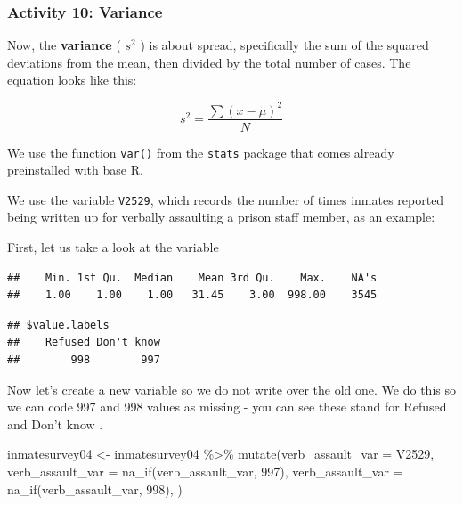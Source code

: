 \documentclass[
]{book}
\newenvironment{Shaded}{\begin{snugshade}}{\end{snugshade}}
\newcommand{\AttributeTok}[1]{\textcolor[rgb]{0.77,0.63,0.00}{#1}}
\newcommand{\DecValTok}[1]{\textcolor[rgb]{0.00,0.00,0.81}{#1}}
\newcommand{\FunctionTok}[1]{\textcolor[rgb]{0.00,0.00,0.00}{#1}}
\newcommand{\NormalTok}[1]{#1}
\newcommand{\OtherTok}[1]{\textcolor[rgb]{0.56,0.35,0.01}{#1}}
\newcommand{\SpecialCharTok}[1]{\textcolor[rgb]{0.00,0.00,0.00}{#1}}
\begin{document}
\hypertarget{activity-10-variance}{%
\subsubsection{Activity 10: Variance}\label{activity-10-variance}}

Now, the \textbf{variance} ( \(s^2\) ) is about spread, specifically the sum of the squared deviations from the mean, then divided by the total number of cases. The equation looks like this:

\[ s^2 = \frac{\sum(x - \mu)^2}{N}\]

We use the function \texttt{var()} from the \texttt{stats} package that comes already preinstalled with base R.

We use the variable \texttt{V2529}, which records the number of times inmates reported being written up for verbally assaulting a prison staff member, as an example:

First, let us take a look at the variable

\begin{Shaded}
\end{Shaded}

\begin{verbatim}
##    Min. 1st Qu.  Median    Mean 3rd Qu.    Max.    NA's 
##    1.00    1.00    1.00   31.45    3.00  998.00    3545
\end{verbatim}

\begin{Shaded}
\end{Shaded}

\begin{verbatim}
## $value.labels
##    Refused Don't know 
##        998        997
\end{verbatim}

Now let's create a new variable so we do not write over the old one. We do this so we can code 997 and 998 values as missing - you can see these stand for Refused and Don't know .

\begin{Shaded}
\begin{Highlighting}[]
\NormalTok{inmatesurvey04 }\OtherTok{\textless{}{-}}\NormalTok{ inmatesurvey04 }\SpecialCharTok{\%\textgreater{}\%} 
  \FunctionTok{mutate}\NormalTok{(}\AttributeTok{verb\_assault\_var =}\NormalTok{ V2529,}
          \AttributeTok{verb\_assault\_var =} \FunctionTok{na\_if}\NormalTok{(verb\_assault\_var, }\DecValTok{997}\NormalTok{),}
          \AttributeTok{verb\_assault\_var =} \FunctionTok{na\_if}\NormalTok{(verb\_assault\_var, }\DecValTok{998}\NormalTok{),}
\NormalTok{         )}
\end{Highlighting}
\end{Shaded}
\end{document}
